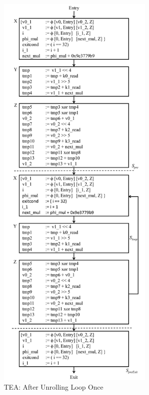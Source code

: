 \begin{figure}[H]
\begin{center}
\includegraphics[height=8in]{fig-proposal/tea-after-two-iterations}
\caption{TEA: After Unrolling Loop Once}
\label{fig:tea-algorithm-two-iterations}
\end{center}
\end{figure}


